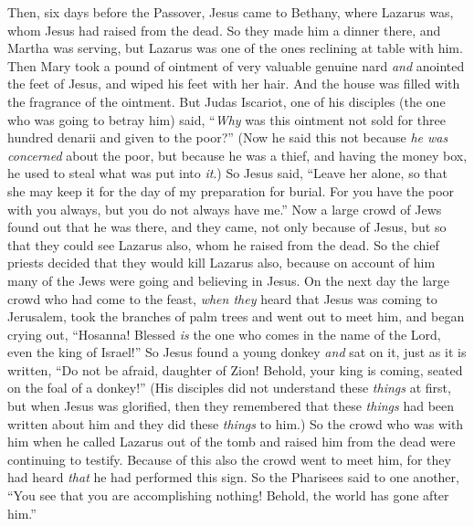 \begin{biblechapter} %
 Then, six days before the Passover, Jesus came to Bethany, where Lazarus was, whom Jesus had raised from the dead.
\verse So they made him a dinner there, and Martha was serving, but Lazarus was one of the ones reclining at table with him.
\verse Then Mary took a pound of ointment of very valuable genuine nard \textit{and} anointed the feet of Jesus, and wiped his feet with her hair. And the house was filled with the fragrance of the ointment.
\verse But Judas Iscariot, one of his disciples (the one who was going to betray him) said,
\verse “\textit{Why} was this ointment not sold for three hundred denarii and given to the poor?”
\verse (Now he said this not because \textit{he was concerned} about the poor, but because he was a thief, and having the money box, he used to steal what was put into \textit{it}.)
\verse So Jesus said, “Leave her alone, so that she may keep it for the day of my preparation for burial.
\verse For you have the poor with you always, but you do not always have me.”
 Now a large crowd of Jews found out that he was there, and they came, not only because of Jesus, but so that they could see Lazarus also, whom he raised from the dead.
\verse So the chief priests decided that they would kill Lazarus also,
\verse because on account of him many of the Jews were going and believing in Jesus.
 On the next day the large crowd who had come to the feast, \textit{when they} heard that Jesus was coming to Jerusalem,
\verse took the branches of palm trees and went out to meet him, and began crying out, “Hosanna! 
Blessed \textit{is} the one who comes in the name of the Lord, 
even the king of Israel!”
\verse So Jesus found a young donkey \textit{and} sat on it, just as it is written,
\verse “Do not be afraid, daughter of Zion! 
Behold, your king is coming, 
seated on the foal of a donkey!”
\verse (His disciples did not understand these \textit{things} at first, but when Jesus was glorified, then they remembered that these \textit{things} had been written about him and they did these \textit{things} to him.)
\verse So the crowd who was with him when he called Lazarus out of the tomb and raised him from the dead were continuing to testify.
\verse Because of this also the crowd went to meet him, for they had heard \textit{that} he had performed this sign.
\verse So the Pharisees said to one another, “You see that you are accomplishing nothing! Behold, the world has gone after him.”

\end{biblechapter}
